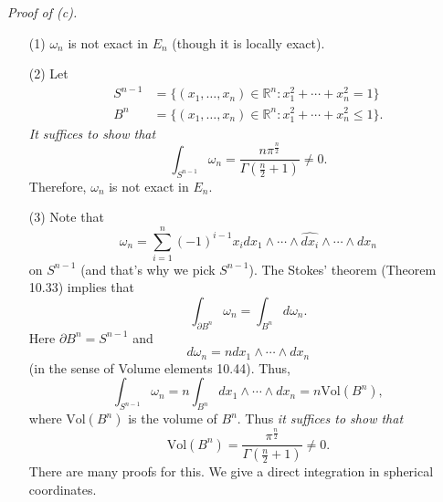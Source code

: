 \documentclass{article}
\begin{document}



\emph{Proof of (c).}
\begin{enumerate}
\item[(1)]
  $\omega_n$ is not exact in $E_n$ (though it is locally exact).

\item[(2)]
  Let
  \begin{align*}
    S^{n-1}
    &= \{ (x_1,\ldots,x_n) \in \mathbb{R}^n : x_1^2+\cdots+x_n^2 = 1 \} \\
    B^{n}
    &= \{ (x_1,\ldots,x_n) \in \mathbb{R}^n : x_1^2+\cdots+x_n^2 \leq 1 \}.
  \end{align*}
  \emph{It suffices to show that}
  \[
    \int_{S^{n-1}} \omega_n
    = \frac{n \pi^{\frac{n}{2}}}{\Gamma\left(\frac{n}{2}+1\right)} \neq 0.
  \]
  Therefore, $\omega_n$ is not exact in $E_n$.

\item[(3)]
  Note that
  \[
    \omega_n
    = \sum_{i=1}^{n} (-1)^{i-1} x_i
    dx_1 \wedge \cdots \wedge \widehat{dx_i} \wedge \cdots \wedge dx_{n}
  \]
  on $S^{n-1}$ (and that's why we pick $S^{n-1}$).
  The Stokes' theorem (Theorem 10.33) implies that
  \[
    \int_{\partial B^{n}} \omega_n = \int_{B^{n}} d\omega_n.
  \]
  Here $\partial B^{n} = S^{n-1}$ and
  \[
    d\omega_n
    = n dx_1 \wedge \cdots \wedge dx_n
  \]
  (in the sense of Volume elements 10.44).
  Thus,
  \[
    \int_{S^{n-1}} \omega_n
    = n \int_{B^{n}} dx_1 \wedge \cdots \wedge dx_n
    = n \mathrm{Vol}(B^n),
  \]
  where $\mathrm{Vol}(B^n)$ is the volume of $B^n$.
  Thus
  \emph{it suffices to show that}
  \[
    \mathrm{Vol}(B^n) = \frac{\pi^{\frac{n}{2}}}{\Gamma\left(\frac{n}{2}+1\right)} \neq 0.
  \]
  There are many proofs for this.
  We give a direct integration in spherical coordinates.


\end{enumerate}
\end{document}
